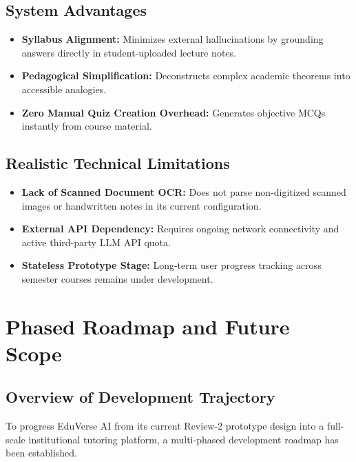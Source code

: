 \documentclass[11pt,a4paper]{report}
\begin{document}
\section{System Advantages}
\begin{itemize}[noitemsep, topsep=2pt]
    \item \textbf{Syllabus Alignment:} Minimizes external hallucinations by grounding answers directly in student-uploaded lecture notes.
    \item \textbf{Pedagogical Simplification:} Deconstructs complex academic theorems into accessible analogies.
    \item \textbf{Zero Manual Quiz Creation Overhead:} Generates objective MCQs instantly from course material.
\end{itemize}

\section{Realistic Technical Limitations}
\begin{itemize}[noitemsep, topsep=2pt]
    \item \textbf{Lack of Scanned Document OCR:} Does not parse non-digitized scanned images or handwritten notes in its current configuration.
    \item \textbf{External API Dependency:} Requires ongoing network connectivity and active third-party LLM API quota.
    \item \textbf{Stateless Prototype Stage:} Long-term user progress tracking across semester courses remains under development.
\end{itemize}
\clearpage

\chapter{Phased Roadmap and Future Scope}
\label{ch:roadmap}

\section{Overview of Development Trajectory}
To progress EduVerse AI from its current Review-2 prototype design into a full-scale institutional tutoring platform, a multi-phased development roadmap has been established.
\end{document}
